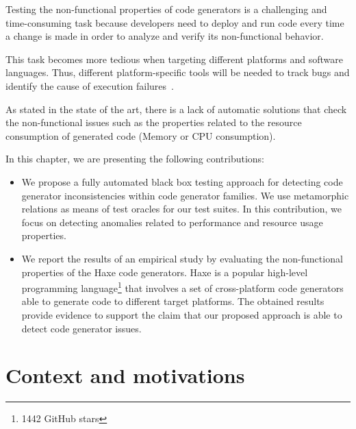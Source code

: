 Testing the non-functional properties of code generators is a challenging and time-consuming task because developers need to deploy and run code every time a change is made in order to analyze and verify its non-functional behavior.

This task becomes more tedious when targeting different platforms and software languages. Thus, different platform-specific tools will be needed to track bugs and identify the cause of execution failures~\cite{guana2014chaintracker,delgado2004taxonomy}. 

As stated in the state of the art, there is a lack of automatic solutions that check the non-functional issues such as the properties related to the resource consumption of generated code (Memory or CPU consumption).



In this chapter, we are presenting the following contributions:

\begin{itemize} 	
	
	\item We propose a fully automated black box testing approach for detecting code generator inconsistencies within code generator families. We use metamorphic relations as means of test oracles for our test suites. In this contribution, we focus on detecting anomalies related to performance and resource usage properties.
	
	\item We report the results of an empirical study by evaluating the non-functional properties of the Haxe code generators. 
	Haxe is a popular high-level programming language\footnote{\num{1442} GitHub stars} that involves a set of cross-platform code generators able to generate code to different target platforms. The obtained results provide evidence to support the claim that our proposed approach is able to detect code generator issues.
	

	
\end{itemize}

\section{Context and motivations}
\label{sec:cg_Motivation}

